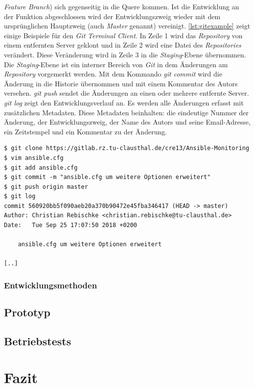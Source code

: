 \documentclass[titlepage]{report}
\begin{document}
\emph{Feature Branch}) sich gegenseitig in
die Quere kommen. Ist die Entwicklung an der Funktion abgeschlossen wird
der Entwicklungszweig wieder mit dem ursprünglichen Hauptzweig (auch
\emph{Master} genannt) vereinigt. \autoref{lst:gitexample} zeigt einige
Beispiele für den \emph{Git Terminal Client}. In Zeile 1 wird das
\emph{Repository} von einem entfernten Server geklont und in Zeile 2
wird eine Datei des \emph{Repositories} verändert. Diese Veränderung
wird in Zeile 3 in die \emph{Staging}\hyp{}Ebene übernommen. Die
\emph{Staging}\hyp{}Ebene ist ein interner Bereich von \emph{Git} in dem
Änderungen am \emph{Repository} vorgemerkt werden\cite{PROGIT}. Mit dem
Kommando \emph{git commit} wird die Änderung in die Historie übernommen
und mit einem Kommentar des Autors versehen. \emph{git push} sendet die
Änderungen an einen oder mehrere entfernte Server. \emph{git log} zeigt
den Entwicklungsverlauf an. Es werden alle Änderungen erfasst mit
zusätzlichen Metadaten. Diese Metadaten beinhalten: die eindeutige
Nummer der Änderung, der Entwicklungszweig, der Name des Autors und
seine Email\hyp{}Adresse, ein Zeitstempel und ein Kommentar zu der
Änderung.
\begin{minipage}{\linewidth}
\begin{lstlisting}[caption={Beispiele für die Verwendung des
Git-Clients},label={lst:gitexample}]
$ git clone https://gitlab.rz.tu-clausthal.de/cre13/Ansible-Monitoring
$ vim ansible.cfg
$ git add ansible.cfg
$ git commit -m "ansible.cfg um weitere Optionen erweitert"
$ git push origin master
$ git log
commit 560920bb5f090aeb20a370b90472e45fba346417 (HEAD -> master)
Author: Christian Rebischke <christian.rebischke@tu-clausthal.de>
Date:   Tue Sep 25 17:07:50 2018 +0200

    ansible.cfg um weitere Optionen erweitert

[..]
\end{lstlisting}
\end{minipage}
\subsection*{Entwicklungsmethoden}
\section*{Prototyp}
\section*{Betriebstests}
\chapter*{Fazit}
\nocite{*}
\printbibliography{}
\lstlistoflistings{}
\listoftables{}
\listoffigures
\printglossary{}
\end{document}
